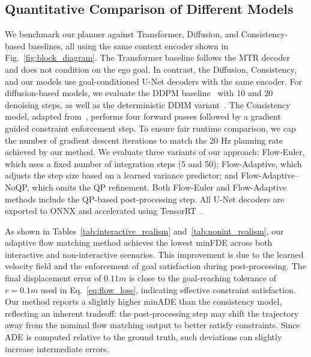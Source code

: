 \documentclass[conference]{IEEEtran}
\begin{document}
\subsection{Quantitative Comparison of Different Models}
We benchmark our planner against Transformer, Diffusion, and Consistency-based baselines, all using the same context encoder shown in Fig.~\ref{fig:block_diagram}. The Transformer baseline follows the MTR decoder~\cite{mtr} and does not condition on the ego goal. In contrast, the Diffusion, Consistency, and our models use goal-conditioned U-Net decoders with the same encoder. For diffusion-based models, we evaluate the DDPM baseline~\cite{vanilla_diffusion} with 10 and 20 denoising steps, as well as the deterministic DDIM variant~\cite{ddim}. The Consistency model, adapted from~\cite{consistency_model_hri}, performs four forward passes followed by a gradient guided constraint enforcement step. To ensure fair runtime comparison, we cap the number of gradient descent iterations to match the 20 Hz planning rate achieved by our method. We evaluate three variants of our approach: Flow-Euler, which uses a fixed number of integration steps (5 and 50); Flow-Adaptive, which adjusts the step size based on a learned variance predictor; and Flow-Adaptive–NoQP, which omits the QP refinement. Both Flow-Euler and Flow-Adaptive methods include the QP-based post-processing step. All U-Net decoders are exported to ONNX and accelerated using TensorRT~\cite{tensorrt}.


As shown in Tables~\ref{tab:interactive_realism} and~\ref{tab:nonint_realism}, our adaptive flow matching method achieves the lowest minFDE across both interactive and non-interactive scenarios. This improvement is due to the learned velocity field and the  enforcement of goal satisfaction during post-processing. The final displacement error of $0.11m$ is close to the goal-reaching tolerance of $r=0.1m$ used in Eq.~\ref{eq:flow_loss}, indicating effective constraint satisfaction. Our method reports a slightly higher minADE than the consistency model, reflecting an inherent tradeoff: the post-processing step may shift the trajectory away from the nominal flow matching output to better satisfy constraints. Since ADE is computed relative to the ground truth, such deviations can slightly increase intermediate errors.
\end{document}
